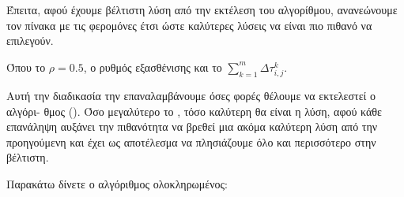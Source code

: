 Έπειτα, αφού έχουμε βέλτιστη λύση από την εκτέλεση του αλγορίθμου, ανανεώνουμε τον πίνακα με τις φερομόνες έτσι ώστε καλύτερες λύσεις να είναι πιο πιθανό να επιλεγούν.

Όπου το $ρ=0.5$, ο ρυθμός εξασθένισης και  το $\sum_{k=1}^{m}{Δτ^k_{i,j}}$. 


Αυτή την διαδικασία την επαναλαμβάνουμε όσες φορές θέλουμε να εκτελεστεί ο αλγόρι- θμος (). Όσο μεγαλύτερο το , τόσο καλύτερη θα είναι η λύση, αφού κάθε επανάληψη αυξάνει την πιθανότητα να βρεθεί μια ακόμα καλύτερη λύση από την προηγούμενη και έχει ως αποτέλεσμα να πλησιάζουμε όλο και περισσότερο στην βέλτιστη.

Παρακάτω δίνετε ο αλγόριθμος ολοκληρωμένος:



